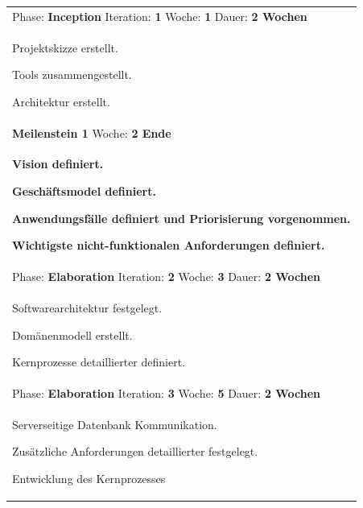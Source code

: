 \documentclass[11pt,ngerman]{article}
\begin{document}
\begin{tabularx}{\textwidth}{X}
	\toprule
	Phase: \textbf{Inception} Iteration: \textbf{1} Woche: \textbf{1} Dauer: \textbf{2 Wochen}\\
	\begin{compactitem}
		\item Projektskizze erstellt.
		\item Tools zusammengestellt.
		\item Architektur erstellt.
	\end{compactitem}\\
	\toprule
	\rowcolor{lightgray}
	\textbf{Meilenstein 1} Woche: \textbf{2 Ende}\\
	\rowcolor{lightgray}
	\begin{compactitem}
		\item \textbf{Vision definiert.}
		\item \textbf{Geschäftsmodel definiert.}
		\item \textbf{Anwendungsfälle definiert und Priorisierung vorgenommen.}
		\item \textbf{Wichtigste nicht-funktionalen Anforderungen definiert.}
	\end{compactitem}\\
	\toprule
	Phase: \textbf{Elaboration} Iteration: \textbf{2} Woche: \textbf{3} Dauer: \textbf{2 Wochen}\\
	\begin{compactitem}
		\item Softwarearchitektur festgelegt.
		\item Domänenmodell erstellt.
		\item Kernprozesse detaillierter definiert.
	\end{compactitem}\\
	\toprule
	Phase: \textbf{Elaboration} Iteration: \textbf{3} Woche: \textbf{5} Dauer: \textbf{2 Wochen}\\
	\begin{compactitem}
		\item Serverseitige Datenbank Kommunikation.
		\item Zusätzliche Anforderungen detaillierter festgelegt.
		\item Entwicklung des Kernprozesses


\end{compactitem}
\end{tabularx}
\end{document}
